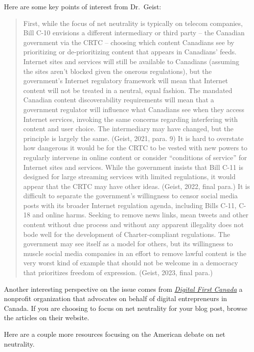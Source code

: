 \documentclass[
  letterpaper,
  DIV=11,
  numbers=noendperiod]{scrreprt}
\begin{document}
\begin{tcolorbox}
Here are some key points of interest from Dr.~Geist:

\begin{quote}
First, while the focus of net neutrality is typically on telecom
companies, Bill C-10 envisions a different intermediary or third party
-- the Canadian government via the CRTC -- choosing which content
Canadians see by prioritizing or de-prioritizing content that appears in
Canadians' feeds. Internet sites and services will still be available to
Canadians (assuming the sites aren't blocked given the onerous
regulations), but the government's Internet regulatory framework will
mean that Internet content will not be treated in a neutral, equal
fashion. The mandated Canadian content discoverability requirements will
mean that a government regulator will influence what Canadians see when
they access Internet services, invoking the same concerns regarding
interfering with content and user choice. The intermediary may have
changed, but the principle is largely the same. (Geist, 2021, para. 9)
It is hard to overstate how dangerous it would be for the CRTC to be
vested with new powers to regularly intervene in online content or
consider ``conditions of service'' for Internet sites and services.
While the government insists that Bill C-11 is designed for large
streaming services with limited regulations, it would appear that the
CRTC may have other ideas. (Geist, 2022, final para.) It is difficult to
separate the government's willingness to censor social media posts with
its broader Internet regulation agenda, including Bills C-11, C-18 and
online harms. Seeking to remove news links, mean tweets and other
content without due process and without any apparent illegality does not
bode well for the development of Charter-compliant regulations. The
government may see itself as a model for others, but its willingness to
muscle social media companies in an effort to remove lawful content is
the very worst kind of example that should not be welcome in a democracy
that prioritizes freedom of expression. (Geist, 2023, final para.)
\end{quote}

Another interesting perspective on the issue comes from
\href{https://digitalfirstcanada.ca/}{\emph{Digital First Canada}} a
nonprofit organization that advocates on behalf of digital entrepreneurs
in Canada. If you are choosing to focus on net neutrality for your blog
post, browse the articles on their website.

Here are a couple more resources focusing on the American debate on net
neutrality.


\end{tcolorbox}
\end{document}
